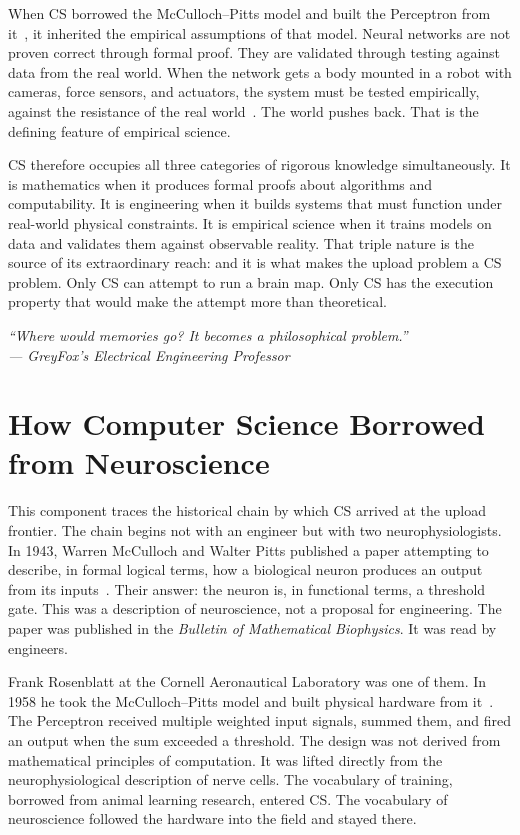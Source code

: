 \documentclass[12pt, a4paper]{article}
\begin{document}
When CS borrowed the McCulloch--Pitts model and built the Perceptron from it~\cite{CS-4,CS-5}, it
inherited the empirical assumptions of that model. Neural networks are not proven correct through
formal proof. They are validated through testing against data from the real world. When the network
gets a body mounted in a robot with cameras, force sensors, and actuators, the system must be tested
empirically, against the resistance of the real world~\cite{CS-6}. The world pushes back. That is the
defining feature of empirical science.

CS therefore occupies all three categories of rigorous knowledge simultaneously. It is mathematics
when it produces formal proofs about algorithms and computability. It is engineering when it builds
systems that must function under real-world physical constraints. It is empirical science when it
trains models on data and validates them against observable reality. That triple nature is the source
of its extraordinary reach: and it is what makes the upload problem a CS problem. Only CS can attempt
to run a brain map. Only CS has the execution property that would make the attempt more than
theoretical.

\begin{displayquote}
\itshape
``Where would memories go? It becomes a philosophical problem.''\\
\upshape --- GreyFox's Electrical Engineering Professor
\end{displayquote}

\section{How Computer Science Borrowed from Neuroscience}

This component traces the historical chain by which CS arrived at the upload frontier. The chain
begins not with an engineer but with two neurophysiologists. In 1943, Warren McCulloch and Walter
Pitts published a paper attempting to describe, in formal logical terms, how a biological neuron
produces an output from its inputs~\cite{Bor-1}. Their answer: the neuron is, in functional terms, a
threshold gate. This was a description of neuroscience, not a proposal for engineering. The paper was
published in the \textit{Bulletin of Mathematical Biophysics}. It was read by engineers.

Frank Rosenblatt at the Cornell Aeronautical Laboratory was one of them. In 1958 he took the
McCulloch--Pitts model and built physical hardware from it~\cite{Bor-2}. The Perceptron received
multiple weighted input signals, summed them, and fired an output when the sum exceeded a threshold.
The design was not derived from mathematical principles of computation. It was lifted directly from
the neurophysiological description of nerve cells. The vocabulary of training, borrowed from animal
learning research, entered CS. The vocabulary of neuroscience followed the hardware into the field
and stayed there.
\end{document}

